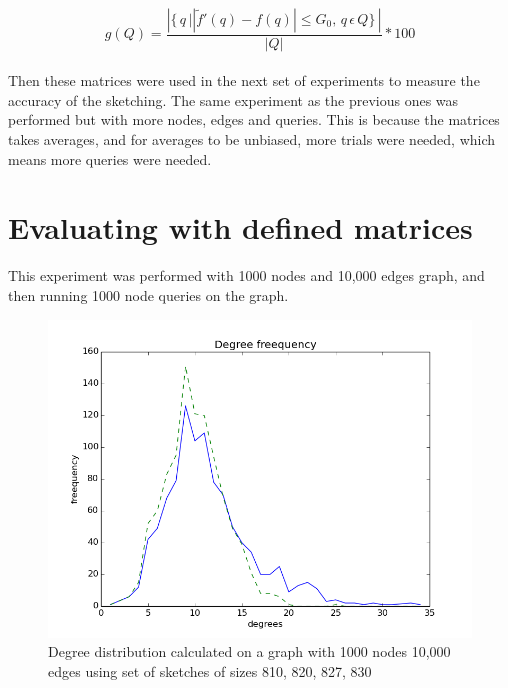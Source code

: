 \documentclass[12pt]{report}
\numberwithin{figure}{section}
\numberwithin{table}{section}
\begin{document}
\paragraph{}

\begin{equation}
g(Q) =  \frac{\left | \{\,q\, |   \left |\tilde{f}'(q) - f(q)\right | \leq G_0, \,q \, \epsilon  \,Q\} \, \right|}{|Q|}*100
\end{equation}

\paragraph{}
 
Then these matrices were used in the next set of experiments to measure the accuracy of the sketching. The same experiment as the previous ones was performed but with more nodes, edges and queries. This is because the matrices takes averages, and for averages to be unbiased, more trials were needed, which means more queries were needed.

\section{Evaluating with defined matrices}

This experiment was performed with 1000 nodes and 10,000 edges graph, and then running 1000 node queries on the graph.

\begin{figure}[H]
\centering
\includegraphics[scale=0.6]{images/n1000-e10000-sketches-810-820-823-827-830plot}
\caption[1000 nodes 10,000 edges with sketches of sizes 810, 820, 827, 830]{Degree distribution calculated on a graph with 1000 nodes 10,000 edges using set of sketches of sizes 810, 820, 827, 830}
\end{figure}
\end{document}
